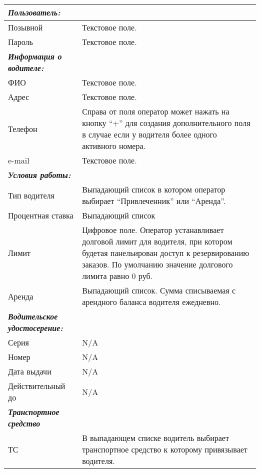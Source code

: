 \begin{longtable}{|p{5cm}|p{10cm}|}
                        \hline  \textbf{\textit{Пользователь:}} & \\ [2mm]
	                        \hline  Позывной & Текстовое поле. \\ [2mm]
	                        \hline  Пароль   & Текстовое поле. \\ [2mm]
                        \hline  \textbf{\textit{Информация о водителе:}}  & \\ [2mm]
	                        \hline  ФИО   & Текстовое поле.\\ [2mm]
	                        \hline  Адрес   & Текстовое поле.\\ [2mm]
	                        \hline  Телефон   & Справа от поля оператор может нажать на кнопку “+” для создания дополнительного поля в случае если у водителя более одного активного номера. \\ [2mm]
	                        \hline  e-mail   & Текстовое поле.\\ [2mm]
                        \hline  \textbf{\textit{Условия работы:}}   & \\ [2mm]
	                        \hline  Тип водителя   & Выпадающий список в котором оператор выбирает “Привлеченник” или “Аренда”. \\ [2mm]
	                        \hline  Процентная ставка   & Выпадающий список \\ [2mm]
	                        \hline  Лимит   & Цифровое поле. Оператор устанавливает долговой лимит для водителя, при котором будетая панельирован доступ к резервированию заказов. По умолчанию значение долгового лимита равно 0 руб.\\ [2mm]
	                        \hline  Аренда   & Выпадающий список. Сумма списываемая с арендного баланса водителя ежедневно.	\\ [2mm]
                        \hline  \textbf{\textit{Водительское удостосерение:}}   & \\ [2mm]
	                        \hline  Серия   & N/A\\ [2mm]
	                        \hline  Номер   & N/A\\ [2mm]
	                        \hline  Дата выдачи   & N/A\\ [2mm]
	                        \hline  Действительный до & N/A\\ [2mm]
                        \hline \textbf{\textit{Транспортное средство}} & \\ [2mm]
                     	  	\hline ТС & В выпадающем списке водитель выбирает транспортное средство к которому привязывает водителя. \\ [2mm]
                        \hline
                    \end{longtable}

